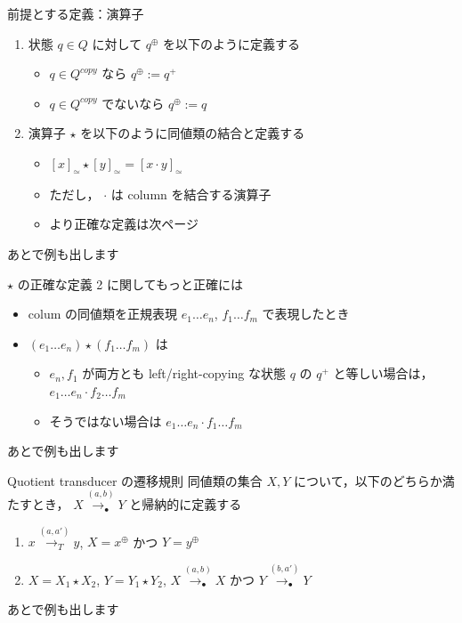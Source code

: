 \documentclass[presentation, xetex]{beamer}
\begin{document}
\begin{frame}[label={sec:orgcc08749}]{前提とする定義：演算子}
\begin{enumerate}
\item 状態 \(q \in Q\) に対して \(q^\oplus\) を以下のように定義する
\begin{itemize}
\item \(q \in Q^{copy}\) なら \(q^\oplus := q^+\)
\item \(q \in Q^{copy}\) でないなら \(q^\oplus := q\)
\end{itemize}

\item 演算子 \(\star\) を以下のように同値類の結合と定義する
\begin{itemize}
\item \([x]_\simeq \star [y]_\simeq = [x \cdot y]_\simeq\)
\item ただし， \(\cdot\) は column を結合する演算子
\item より正確な定義は次ページ
\end{itemize}
\end{enumerate}


あとで例も出します
\end{frame}


\begin{frame}[label={sec:org02b46ea}]{\(\star\) の正確な定義}
2 に関してもっと正確には
\begin{itemize}
\item colum の同値類を正規表現 \(e_1 \dots e_n\), \(f_1 \dots f_m\) で表現したとき
\item \((e_1 \dots e_n) \star (f_1 \dots f_m)\) は
\begin{itemize}
\item \(e_n, f_1\) が両方とも left/right-copying な状態 \(q\) の \(q^+\)
と等しい場合は，
\(e_1 \dots e_n \cdot f_2 \dots f_m\)
\item そうではない場合は
\(e_1 \dots e_n \cdot f_1 \dots f_m\)
\end{itemize}
\end{itemize}


あとで例も出します
\end{frame}


\begin{frame}[label={sec:org1ec1f27}]{Quotient transducer の遷移規則}
同値類の集合 \(X, Y\) について，以下のどちらか満たすとき，
\(X \overset{(a, b)}{\longrightarrow_\bullet} Y\) と帰納的に定義する
\begin{enumerate}
\item \(x \overset{(a, a')}{\longrightarrow_T} y\),
\(X = x^\oplus\) かつ \(Y = y^\oplus\)
\item \(X = X_1 \star X_2\), \(Y = Y_1 \star Y_2\),
\(X \overset{(a, b)}{\longrightarrow_\bullet} X\) かつ
\(Y \overset{(b, a')}{\longrightarrow_\bullet} Y\)
\end{enumerate}


あとで例も出します
\end{frame}
\end{document}
